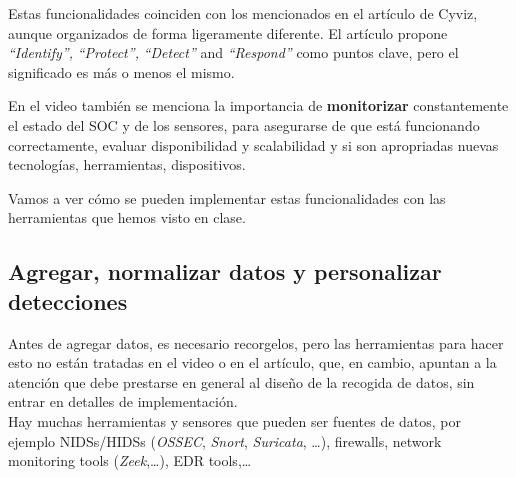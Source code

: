 Estas funcionalidades coinciden con los mencionados en el artículo de Cyviz, aunque organizados de forma ligeramente diferente.
El artículo propone \textit{``Identify'',} \textit{``Protect'',} \textit{``Detect''} and \textit{``Respond''} como puntos clave, pero el significado es más o menos el mismo.


En el video también se menciona la importancia de \textbf{monitorizar} constantemente el estado del SOC y de los sensores, para asegurarse de que está funcionando correctamente, evaluar disponibilidad y scalabilidad y si son apropriadas nuevas tecnologías, herramientas, dispositivos.


Vamos a ver cómo se pueden implementar estas funcionalidades con las herramientas que hemos visto en clase.
\subsection{Agregar, normalizar datos y personalizar detecciones}

   


Antes de agregar datos, es necesario recorgelos, pero las herramientas para hacer esto no están tratadas en el video o en el artículo, que, en cambio, apuntan a la atención que debe prestarse en general al diseño de la recogida de datos, sin entrar en detalles de implementación.\\
Hay muchas herramientas y sensores que pueden ser fuentes de datos, por ejemplo NIDSs/HIDSs (\textsl{OSSEC}, \textsl{Snort}, \textsl{Suricata}, \dots), firewalls, network monitoring tools (\textsl{Zeek},\dots), EDR tools,\dots
{}

